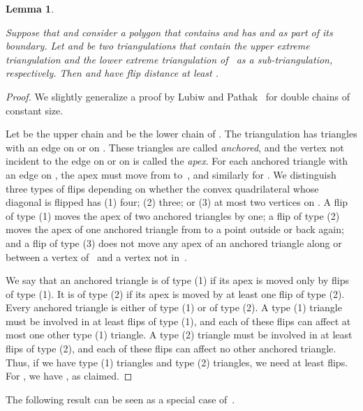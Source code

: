 \documentclass[a4paper,11pt]{article}
\newtheorem{lemma}[theorem]{Lemma}
\newcommand{\qedopt}{}
\begin{document}
\begin{lemma}\label{lem_lower_bound}
\begin{sloppypar}
Suppose that  and
consider a polygon that contains  and has  and  as part of 
its boundary.
Let  and  be two triangulations that contain the upper
extreme triangulation and the lower extreme triangulation of~ as a
sub-triangulation, respectively.  Then  and  have flip distance at
least .
\end{sloppypar}
\end{lemma}
\begin{proof}
We slightly generalize a proof by Lubiw and Pathak~\cite{lubiw} for
double chains of constant size.

Let  be the upper chain and  be the lower
chain of .
The triangulation  has  triangles
with an edge on  or on .
These triangles are called \emph{anchored},
and the vertex not incident to the edge on  or on  
is called the \emph{apex}.
For each anchored triangle with an edge on ,
the apex must move from  to~, and similarly for .
We distinguish three
types of flips depending on whether the convex quadrilateral whose diagonal
is flipped has (1) four; (2) three; or
(3) at most two vertices on .
A flip of type (1) moves the apex
of two anchored triangles by one; a flip of type (2) moves the apex of one 
anchored triangle from
 to a point outside  or back again; and a flip of type (3)
does not move any apex of an anchored triangle along  or between a vertex 
of~ and a vertex not in~.

We say that an anchored triangle is of type (1) if its apex is moved
only by flips of type (1). It is of type (2) if its apex
is moved by at least one flip of type (2). Every anchored triangle
is either of type (1) or of type (2).
A type (1) triangle must be involved
in at least  flips of type (1), and each of these flips
can affect at most one other type (1) triangle.
A type (2) triangle must be involved in at least 
flips of type (2), and each of these flips can affect
no other anchored triangle.
Thus, if we have  type (1) triangles and  type (2)
triangles, we need at least
 flips.
For , we have
,
as claimed.
\qedopt
\end{proof}

The following result can be seen as a special case of~\cite[Proposition~1]{point_set_hard}.
\end{document}
